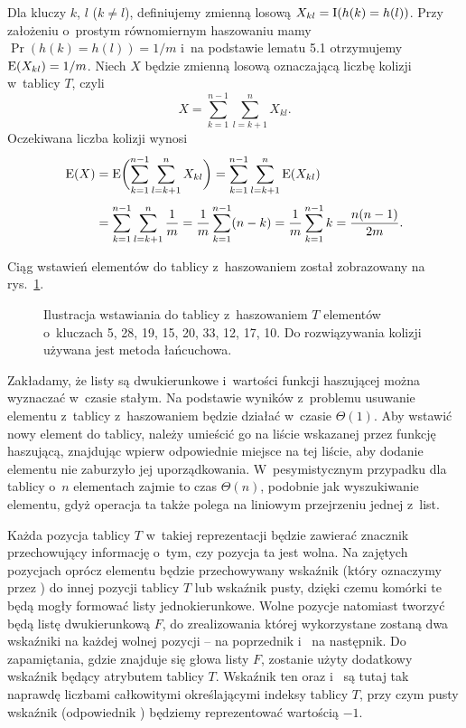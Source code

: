 
\exercise %
Dla kluczy $k$, $l$ ($k\ne l$), definiujemy zmienną losową $X_{kl}=\operatorname{I}(h(k)=h(l))$.
Przy założeniu o~prostym równomiernym haszowaniu mamy $\Pr(h(k)=h(l))=1/m$ i~na podstawie lematu 5.1 otrzymujemy $\operatorname{E}(X_{kl})=1/m$.
Niech $X$ będzie zmienną losową oznaczającą liczbę kolizji w~tablicy $T$, czyli
\[
    X = \sum_{k=1}^{n-1}\sum_{l=k+1}^nX_{kl}.
\]
Oczekiwana liczba kolizji wynosi
\begin{align*}
	\operatorname{E}(X) &= \operatorname{E}\biggl(\sum_{k=1}^{n-1}\sum_{l=k+1}^nX_{kl}\biggr) = \sum_{k=1}^{n-1}\sum_{l=k+1}^n\operatorname{E}(X_{kl}) \\[1mm]
	&= \sum_{k=1}^{n-1}\sum_{l=k+1}^n\frac{1}{m} = \frac{1}{m}\sum_{k=1}^{n-1}(n-k) = \frac{1}{m}\sum_{k=1}^{n-1}k = \frac{n(n-1)}{2m}.
\end{align*}

\exercise %
Ciąg wstawień elementów do tablicy z~haszowaniem został zobrazowany na rys.\ \ref{fig:11.2-2}.
\medskip
\begin{figure}[ht!]
	\centering 
	\caption{Ilustracja wstawiania do tablicy z~haszowaniem $T$ elementów o~kluczach 5, 28, 19, 15, 20, 33, 12, 17, 10.
Do rozwiązywania kolizji używana jest metoda łańcuchowa.} \label{fig:11.2-2}
\end{figure}

\exercise %
Zakładamy, że listy są dwukierunkowe i~wartości funkcji haszującej można wyznaczać w~czasie stałym.
Na podstawie wyników z~problemu  usuwanie elementu z~tablicy z~haszowaniem będzie działać w~czasie $\Theta(1)$.
Aby wstawić nowy element do tablicy, należy umieścić go na liście wskazanej przez funkcję haszującą, znajdując wpierw odpowiednie miejsce na tej liście, aby dodanie elementu nie zaburzyło jej uporządkowania.
W~pesymistycznym przypadku dla tablicy o~$n$ elementach zajmie to czas $\Theta(n)$, podobnie jak wyszukiwanie elementu, gdyż operacja ta także polega na liniowym przejrzeniu jednej z~list.

\exercise %

\noindent Każda pozycja tablicy $T$ w~takiej reprezentacji będzie zawierać znacznik przechowujący informację o~tym, czy pozycja ta jest wolna.
Na zajętych pozycjach oprócz elementu będzie przechowywany wskaźnik (który oznaczymy przez ) do innej pozycji tablicy $T$ lub wskaźnik pusty, dzięki czemu komórki te będą mogły formować listy jednokierunkowe.
Wolne pozycje natomiast tworzyć będą listę dwukierunkową $F$, do zrealizowania której wykorzystane zostaną dwa wskaźniki na każdej wolnej pozycji --  na poprzednik i~ na następnik.
Do zapamiętania, gdzie znajduje się głowa listy $F$, zostanie użyty dodatkowy wskaźnik będący atrybutem tablicy $T$.
Wskaźnik ten oraz  i~ są tutaj tak naprawdę liczbami całkowitymi określającymi indeksy tablicy $T$, przy czym pusty wskaźnik (odpowiednik ) będziemy reprezentować wartością $-1$.

